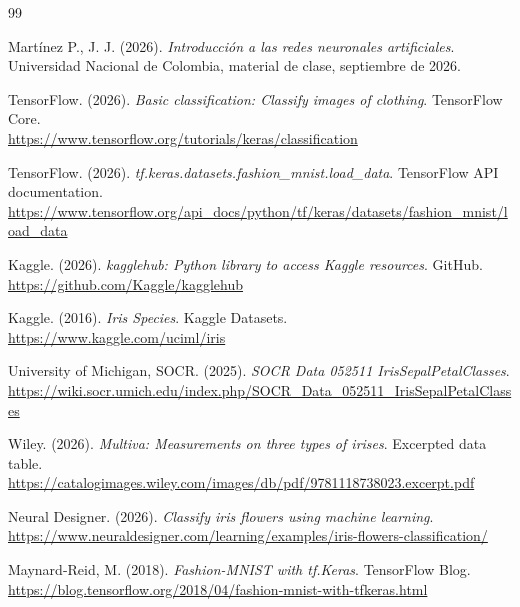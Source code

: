 \documentclass[14pt,twoside]{article}
\begin{document}
\begin{thebibliography}{99}

Martínez P., J. J. (2026). \textit{Introducción a las redes neuronales artificiales}. Universidad Nacional de Colombia, material de clase, septiembre de 2026.

TensorFlow. (2026). \textit{Basic classification: Classify images of clothing}. TensorFlow Core.\\
\url{https://www.tensorflow.org/tutorials/keras/classification}

TensorFlow. (2026). \textit{tf.keras.datasets.fashion\_mnist.load\_data}. TensorFlow API documentation.\\
\url{https://www.tensorflow.org/api_docs/python/tf/keras/datasets/fashion_mnist/load_data}

Kaggle. (2026). \textit{kagglehub: Python library to access Kaggle resources}. GitHub.\\
\url{https://github.com/Kaggle/kagglehub}

Kaggle. (2016). \textit{Iris Species}. Kaggle Datasets.\\
\url{https://www.kaggle.com/uciml/iris}

University of Michigan, SOCR. (2025). \textit{SOCR Data 052511 IrisSepalPetalClasses}.\\
\url{https://wiki.socr.umich.edu/index.php/SOCR_Data_052511_IrisSepalPetalClasses}

Wiley. (2026). \textit{Multiva: Measurements on three types of irises}. Excerpted data table.\\
\url{https://catalogimages.wiley.com/images/db/pdf/9781118738023.excerpt.pdf}

Neural Designer. (2026). \textit{Classify iris flowers using machine learning}.\\
\url{https://www.neuraldesigner.com/learning/examples/iris-flowers-classification/}

Maynard-Reid, M. (2018). \textit{Fashion-MNIST with tf.Keras}. TensorFlow Blog.\\
\url{https://blog.tensorflow.org/2018/04/fashion-mnist-with-tfkeras.html}

\end{thebibliography}
\end{document}
